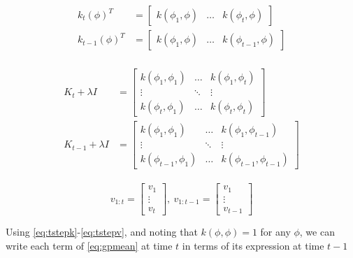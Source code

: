 \documentclass[letterpaper, 10 pt, conference]{ieeeconf}  %
\begin{document}
\begin{align}
\begin{split}
    k_t(\phi)^T &= 
    \begin{bmatrix}
        k(\phi_1,\phi)&\hdots&k(\phi_t,\phi)
    \end{bmatrix}
    \\
    k_{t-1}(\phi)^T &= 
    \begin{bmatrix}
        k(\phi_1,\phi)&\hdots&k(\phi_{t-1},\phi)
    \end{bmatrix}
    \label{eq:tstepk}
\end{split}
\end{align}

\begin{align}
\begin{split}
    K_t+\lambda I &= 
    \begin{bmatrix}
        k(\phi_1,\phi_1)&\hdots&k(\phi_1,\phi_t) \\
        \vdots & \ddots & \vdots \\
        k(\phi_t,\phi_1)&\hdots&k(\phi_t,\phi_t)
    \end{bmatrix}
    \\
    K_{t-1}+\lambda I &= 
    \begin{bmatrix}
        k(\phi_1,\phi_1)&\hdots&k(\phi_1,\phi_{t-1}) \\
        \vdots & \ddots & \vdots \\
        k(\phi_{t-1},\phi_1)&\hdots&k(\phi_{t-1},\phi_{t-1})
    \end{bmatrix}
    \label{eq:tstepK}
\end{split}
\end{align}

\begin{equation}
    v_{1:t} = 
    \begin{bmatrix}
        v_1 \\
        \vdots \\
        v_t
    \end{bmatrix}
    ,\ 
    v_{1:t-1} = 
    \begin{bmatrix}
        v_1 \\
        \vdots \\
        v_{t-1}
    \end{bmatrix}
    \label{eq:tstepv}
\end{equation}
\smallskip

Using \eqref{eq:tstepk}-\eqref{eq:tstepv}, and noting that $k(\phi,\phi)=1$ for any $\phi$, we can write each term of \eqref{eq:gpmean} at time $t$ in terms of its expression at time $t-1$
\end{document}
